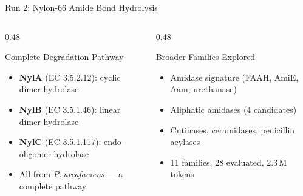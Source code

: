 \documentclass[aspectratio=169, 11pt]{beamer}
\begin{document}
\begin{frame}{Run 2: Nylon-66 Amide Bond Hydrolysis}
\vspace{2pt}
\begin{columns}[T]
\begin{column}{0.48\textwidth}
\begin{exampleblock}{\scriptsize Complete Degradation Pathway}
\vspace{-2pt}
\begin{itemize}\scriptsize
\setlength\itemsep{0pt}
\item \textbf{NylA} (EC 3.5.2.12): cyclic dimer hydrolase
\item \textbf{NylB} (EC 3.5.1.46): linear dimer hydrolase
\item \textbf{NylC} (EC 3.5.1.117): endo-oligomer hydrolase
\item All from \textit{P.\,ureafaciens} --- a complete pathway
\end{itemize}
\end{exampleblock}
\end{column}
\begin{column}{0.48\textwidth}
\begin{block}{\scriptsize Broader Families Explored}
\vspace{-2pt}
\begin{itemize}\scriptsize
\setlength\itemsep{0pt}
\item Amidase signature (FAAH, AmiE, Aam, urethanase)
\item Aliphatic amidases (4 candidates)
\item Cutinases, ceramidases, penicillin acylases
\item 11 families, 28 evaluated, 2.3\,M tokens
\end{itemize}
\end{block}
\end{column}
\end{columns}
\end{frame}
\end{document}
